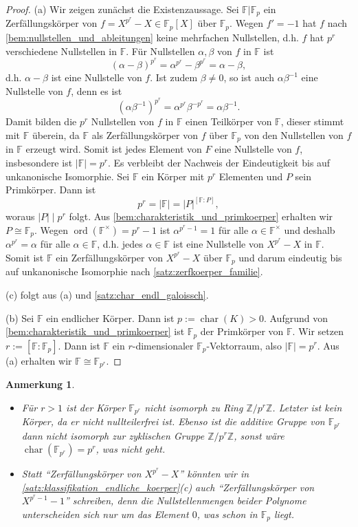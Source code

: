 \documentclass[a4paper, twoside, 11pt, ngerman]{report}
\newcommand{\FF}{\mathds F}
\newcommand{\ZZ}{\mathds Z}
\DeclareMathOperator{\charact}{char}
\DeclareMathOperator{\ord}{ord}
\theoremstyle{definistyle}
\newtheorem{anm}[satz]{Anmerkung}
\theoremstyle{remark}
\begin{document}
\begin{proof}
(a) Wir zeigen zunächst die Existenzaussage. Sei $\FF|\FF_p$ ein Zerfällungskörper von $f=X^{p^r} - X \in \FF_p[X]$ über $\FF_p$.  Wegen $f' = -1$ hat $f$ nach \ref{bem:nullstellen_und_ableitungen} keine mehrfachen Nullstellen, d.h. $f$ hat $p^r$ verschiedene Nullstellen in $\FF$. Für Nullstellen $\alpha,\beta$ von $f$ in $\FF$ ist 
\[
(\alpha - \beta)^{p^r} = \alpha^{p^r} - \beta^{p^r}=\alpha-\beta,
\]
d.h. $\alpha - \beta$ ist eine Nullstelle von $f$. Ist zudem $\beta\neq0$, so ist auch $\alpha\beta^{-1}$ eine Nullstelle
von $f$, denn es ist
\[
(\alpha \beta^{-1})^{p^r} = \alpha^{p^r}\beta^{-p^r} = \alpha\beta^{-1}.
\]
Damit bilden die $p^r$ Nullstellen von $f$ in $\FF$ einen Teilkörper von $\FF$, dieser stimmt mit $\FF$ überein,
da $\FF$ als Zerfällungskörper von $f$ über $\FF_p$ von den Nullstellen von $f$ in $\FF$ erzeugt wird.
Somit ist jedes Element von $F$ eine Nullstelle von $f$, insbesondere ist $|\FF| = p^r$.
Es verbleibt der Nachweis der Eindeutigkeit bis auf unkanonische Isomorphie.
Sei $\FF$ ein Körper mit $p^r$ Elementen und $P$ sein Primkörper.
Dann ist 
\[
p^r=|\FF| = |P|^{[\FF:P]},
\]
woraus $|P|\mid p^r$ folgt. Aus \ref{bem:charakteristik_und_primkoerper} erhalten wir $P\cong\FF_p$.
Wegen $\ord(\FF^\times)=p^r-1$ ist $\alpha^{p^r-1}=1$ für alle $\alpha\in\FF^\times$ und deshalb
$\alpha^{p^r}=\alpha$ für alle $\alpha\in\FF$, d.h. jedes $\alpha\in\FF$
ist eine Nullstelle von $X^{p^r}-X$ in $\FF$. Somit ist $\FF$ ein Zerfällungskörper von $X^{p^r} - X$ über $\FF_p$
und darum eindeutig bis auf unkanonische Isomorphie nach \ref{satz:zerfkoerper_familie}.

(c) folgt aus (a) und \ref{satz:char_endl_galoissch}.

(b) Sei $\FF$ ein endlicher Körper. Dann ist $p:=\charact(K)>0$. Aufgrund von \ref{bem:charakteristik_und_primkoerper}
ist $\FF_p$ der Primkörper von $\FF$. Wir setzen $r:=[\FF:\FF_p]$. Dann ist $\FF$ ein $r$-dimensionaler $\FF_p$-Vektorraum,
also  $|\FF| = p^r$. Aus (a) erhalten wir $\FF\cong\FF_{p^r}$.
\end{proof}

\begin{anm}\label{anm:zu_endl_kp}
\begin{itemize}
\item Für $r>1$ ist der Körper $\FF_{p^r}$ nicht isomorph zu Ring $\ZZ/p^r\ZZ$. Letzter ist kein Körper, da er nicht nullteilerfrei ist. Ebenso ist die additive Gruppe von $\FF_{p^r}$ dann nicht isomorph zur zyklischen Gruppe $\ZZ/p^r\ZZ$, sonst wäre $\charact(\FF_{p^r})=p^r$, was nicht geht.
\item Statt "`Zerfällungskörper von $X^{p^r}-X$"' könnten wir in \ref{satz:klassifikation_endliche_koerper}(c) auch 
"`Zerfällungskörper von $X^{p^r-1}-1$"' schreiben, denn die Nullstellenmengen beider Polynome unterscheiden sich nur um das Element $0$, was schon in $\FF_p$ liegt.
\end{itemize}    
\end{anm}
\end{document}
